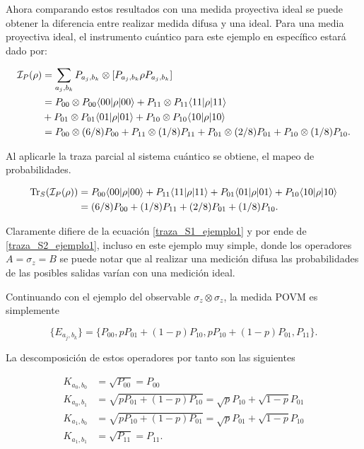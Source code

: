 Ahora comparando estos resultados con una medida proyectiva ideal se puede obtener la diferencia entre realizar medida difusa y una ideal. Para una media proyectiva ideal, el instrumento cuántico para este ejemplo en específico estará dado por:


\begin{equation}\label{proyectiva_ideal_ejemplo}
    \begin{split}
        \mathcal{I}_P(\rho)&=\sum_{a_j,b_k}P_{a_j,b_k}\otimes[P_{a_j,b_k}\rho P_{a_j,b_k}]\\
        &=P_{00}\otimes P_{00} \langle 00|\rho|00\rangle + P_{11}\otimes P_{11} \langle 11|\rho|11\rangle\\
        &+P_{01} \otimes P_{01}\langle 01|\rho|01\rangle +P_{10} \otimes P_{10} \langle 10|\rho|10\rangle\\
        &=P_{00}\otimes (6/8)P_{00} + P_{11}\otimes (1/8)P_{11}+P_{01} \otimes (2/8)P_{01} +P_{10} \otimes (1/8)P_{10}.\\
    \end{split}
\end{equation}


Al aplicarle la traza parcial al sistema cuántico se obtiene, el mapeo de probabilidades.

\begin{equation}\label{traza_SP_ejemplo1}
    \begin{split}
        {\rm Tr}_S(\mathcal{I}_P(\rho)) &= P_{00} \langle 00|\rho|00\rangle + P_{11} \langle 11|\rho|11\rangle+P_{01}\langle 01|\rho|01\rangle +P_{10} \langle 10|\rho|10\rangle\\
        &=(6/8)P_{00} + (1/8)P_{11}+(2/8)P_{01} + (1/8)P_{10}.\\
    \end{split}
\end{equation}

Claramente difiere de la ecuación {\ref{traza_S1_ejemplo1}} y por ende de {\ref{traza_S2_ejemplo1}}, incluso en este ejemplo muy simple, donde los operadores $A=\sigma _z=B$ se puede notar que al realizar una medición difusa las probabilidades de las posibles salidas varían con una medición ideal.

Continuando con el ejemplo del observable $\sigma_z \otimes \sigma_z$, la medida POVM es simplemente 

\[\{E_{a_j, b_k}\}= \{P_{00},p P_{01}+(1-p)P_{10},p P_{10}+(1-p)P_{01},P_{11}\}.\] 


La descomposición de estos operadores por tanto son las siguientes 

\begin{equation}
    \begin{split}
        K_{a_0,b_0}&=\sqrt{P_{00}}=P_{00}\\
        K_{a_0,b_1}&=\sqrt{p P_{01}+(1-p)P_{10}}=\sqrt{p}P_{10}+\sqrt{1-p}P_{01}\\
        K_{a_1,b_0}&=\sqrt{p P_{10}+(1-p)P_{01}}=\sqrt{p}P_{01}+\sqrt{1-p}P_{10}\\
        K_{a_1,b_1}&=\sqrt{P_{11}}=P_{11}.\\
\end{split}
\end{equation} 

